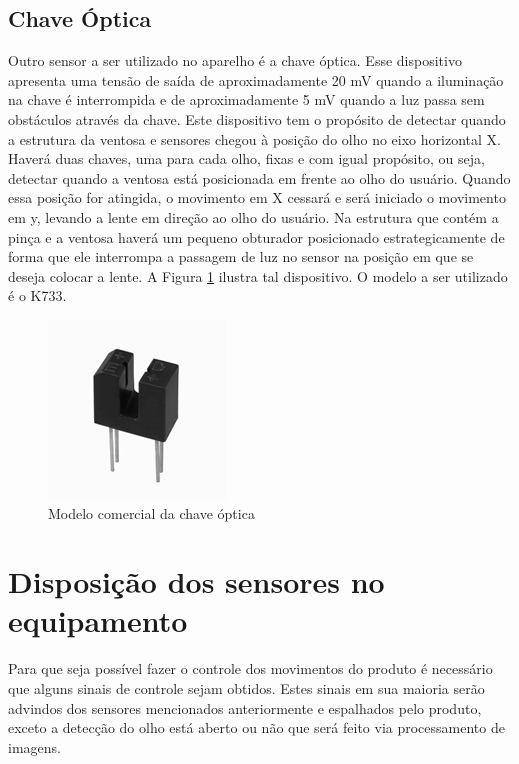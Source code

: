 \subsection[Chave Óptica]{Chave Óptica}

Outro sensor a ser utilizado no aparelho é a chave óptica. Esse dispositivo apresenta uma tensão de saída de aproximadamente 20 mV quando a iluminação na chave é interrompida e de aproximadamente 5 mV quando a luz passa sem obstáculos através da chave. Este dispositivo tem o propósito de detectar quando a estrutura da ventosa e sensores chegou à posição do olho no eixo horizontal X. Haverá duas chaves, uma para cada olho, fixas e com igual propósito, ou seja, detectar quando a ventosa está posicionada em frente ao olho do usuário. Quando essa posição for atingida, o movimento em X cessará e será  iniciado o movimento em y, levando a lente em direção ao olho do usuário. Na estrutura que contém a pinça e a ventosa haverá um pequeno obturador posicionado estrategicamente de forma que ele interrompa a passagem de luz no sensor na posição em que se deseja colocar a lente. A Figura \ref{sensor3} ilustra tal dispositivo. O modelo a ser utilizado é o K733.

\begin{figure}[H]
		\centering
			\includegraphics[scale=1.0]{figuras/sensor3.png}
		\caption{Modelo comercial da chave óptica}
		\label{sensor3}
\end{figure}


\section[Disposição dos sensores no equipamento]{Disposição dos sensores no equipamento}

Para que seja possível fazer o controle dos movimentos do produto é necessário que alguns sinais de controle sejam obtidos. Estes sinais em sua maioria serão advindos dos sensores mencionados anteriormente e espalhados pelo produto, exceto a detecção do olho está aberto ou não que será feito via processamento de imagens.
	
